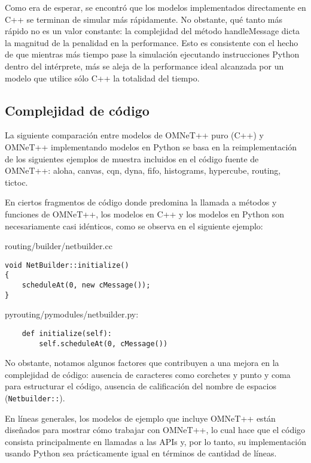 \documentclass[]{article}
\begin{document}
Como era de esperar, se encontró que los modelos implementados directamente en
C++ se terminan de simular más rápidamente. No obstante, qué tanto más rápido
no es un valor constante: la complejidad del método handleMessage dicta la
magnitud de la penalidad en la performance. Esto es consistente con el hecho de
que mientras más tiempo pase la simulación ejecutando instrucciones Python
dentro del intérprete, más se aleja de la performance ideal alcanzada por un
modelo que utilice sólo C++ la totalidad del tiempo.

\subsection{Complejidad de código}

La siguiente comparación entre modelos de OMNeT++ puro (C++) y OMNeT++
implementando modelos en Python se basa en la reimplementación de los
siguientes ejemplos de muestra incluidos en el código fuente de OMNeT++: aloha,
canvas, cqn, dyna,  fifo, histograms, hypercube, routing, tictoc.

En ciertos fragmentos de código donde predomina la llamada a métodos y
funciones de OMNeT++, los modelos en C++ y los modelos en Python son
necesariamente casi idénticos, como se observa en el siguiente ejemplo:

routing/builder/netbuilder.cc

\begin{verbatim}
void NetBuilder::initialize()
{
    scheduleAt(0, new cMessage());
}
\end{verbatim}

pyrouting/pymodules/netbuilder.py:

\begin{verbatim}
    def initialize(self):
        self.scheduleAt(0, cMessage())
\end{verbatim}

No obstante, notamos algunos factores que contribuyen a una mejora en la
complejidad de código: ausencia de caracteres como corchetes y punto y coma
para estructurar el código, ausencia de calificación del nombre de espacios
(\verb!Netbuilder::!).

En líneas generales, los modelos de ejemplo que incluye OMNeT++ están diseñados
para mostrar cómo trabajar con OMNeT++, lo cual hace que el código consista
principalmente en llamadas a las APIs y, por lo tanto, su implementación usando
Python sea prácticamente igual en términos de cantidad de líneas.
\end{document}
